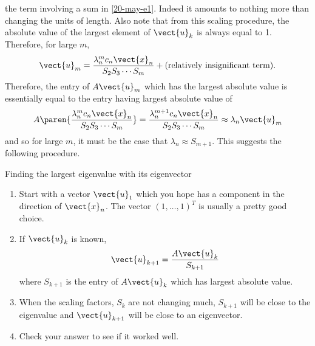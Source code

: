the term involving a sum in {\eqref{20-may-e1}}. Indeed it amounts to nothing more
than changing the units of length. Also note that from this scaling
procedure, the absolute value of the largest element of $\vect{u}_{k}$ is
always equal to 1. Therefore, for large $m$,
\begin{equation*}
\vect{u}_{m}=\vspace{0.05in}\frac{\lambda _{n}^{m}c_{n}\vect{x}_{n}}{S_{2}S_{3}\cdots S_{m}}+(\text{relatively insignificant term}) .
\end{equation*}
Therefore, the entry of $A\vect{u}_{m}$ which has the largest absolute value
is essentially equal to the entry having largest absolute value of 
\begin{equation*}
A\paren{\vspace{0.05in}\frac{\lambda _{n}^{m}c_{n}\vect{x}_{n}}{S_{2}S_{3}\cdots S_{m}}} =\vspace{0.05in}\frac{\lambda _{n}^{m+1}c_{n}
\vect{x}_{n}}{S_{2}S_{3}\cdots S_{m}}\approx \lambda _{n}\vect{u}_{m}
\end{equation*}%
and so for large $m$, it must be the case that $\lambda _{n}\approx S_{m+1}$.
This suggests the following procedure.

\begin{procedure}{Finding the largest eigenvalue with its eigenvector}{}
\begin{enumerate}
\item Start with a vector $\vect{u}_{1}$ which you hope has a component in
the direction of $\vect{x}_{n}$. The vector $(1,\ldots,1) ^{T}$
is usually a pretty good choice.

\item If $\vect{u}_{k}$ is known, 
\begin{equation*}
\vect{u}_{k+1}=\frac{A\vect{u}_{k}}{S_{k+1}}
\end{equation*}
where $S_{k+1}$ is the entry of $A\vect{u}_{k}$ which has largest absolute
value.

\item When the scaling factors, $S_{k}$ are not changing much, $S_{k+1}$
will be close to the eigenvalue and $\vect{u}_{k+1}$ will be close to an
eigenvector.

\item Check your answer to see if it worked well.
\end{enumerate}
\end{procedure}

